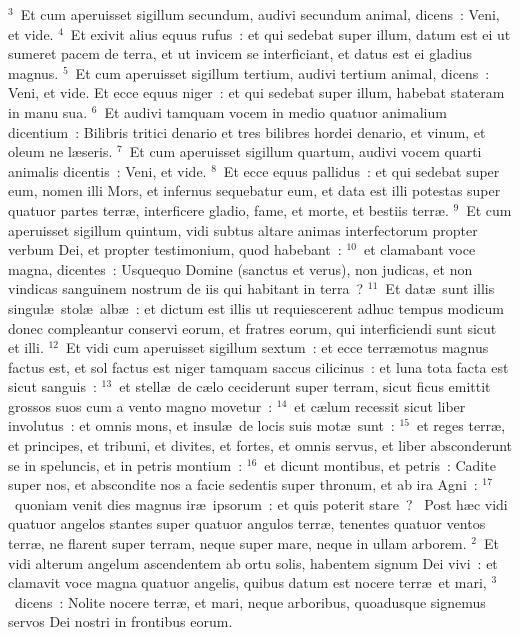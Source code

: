 ${}^{3}$~Et cum aperuisset sigillum secundum, audivi secundum animal, dicens~: Veni, et vide.
${}^{4}$~Et exivit alius equus rufus~: et qui sedebat super illum, datum est ei ut sumeret pacem de terra, et ut invicem se interficiant, et datus est ei gladius magnus.
${}^{5}$~Et cum aperuisset sigillum tertium, audivi tertium animal, dicens~: Veni, et vide. Et ecce equus niger~: et qui sedebat super illum, habebat stateram in manu sua.
${}^{6}$~Et audivi tamquam vocem in medio quatuor animalium dicentium~: Bilibris tritici denario et tres bilibres hordei denario, et vinum, et oleum ne l\ae seris.
${}^{7}$~Et cum aperuisset sigillum quartum, audivi vocem quarti animalis dicentis~: Veni, et vide.
${}^{8}$~Et ecce equus pallidus~: et qui sedebat super eum, nomen illi Mors, et infernus sequebatur eum, et data est illi potestas super quatuor partes terr\ae , interficere gladio, fame, et morte, et bestiis terr\ae .
${}^{9}$~Et cum aperuisset sigillum quintum, vidi subtus altare animas interfectorum propter verbum Dei, et propter testimonium, quod habebant~:
${}^{10}$~et clamabant voce magna, dicentes~: Usquequo Domine (sanctus et verus), non judicas, et non vindicas sanguinem nostrum de iis qui habitant in terra~?
${}^{11}$~Et dat\ae\ sunt illis singul\ae\ stol\ae\ alb\ae~: et dictum est illis ut requiescerent adhuc tempus modicum donec compleantur conservi eorum, et fratres eorum, qui interficiendi sunt sicut et illi.
${}^{12}$~Et vidi cum aperuisset sigillum sextum~: et ecce terr\ae motus magnus factus est, et sol factus est niger tamquam saccus cilicinus~: et luna tota facta est sicut sanguis~:
${}^{13}$~et stell\ae\ de c\ae lo ceciderunt super terram, sicut ficus emittit grossos suos cum a vento magno movetur~:
${}^{14}$~et c\ae lum recessit sicut liber involutus~: et omnis mons, et insul\ae\ de locis suis mot\ae\ sunt~:
${}^{15}$~et reges terr\ae , et principes, et tribuni, et divites, et fortes, et omnis servus, et liber absconderunt se in speluncis, et in petris montium~:
${}^{16}$~et dicunt montibus, et petris~: Cadite super nos, et abscondite nos a facie sedentis super thronum, et ab ira Agni~:
${}^{17}$~quoniam venit dies magnus ir\ae\ ipsorum~: et quis poterit stare~?
~Post h\ae c vidi quatuor angelos stantes super quatuor angulos terr\ae , tenentes quatuor ventos terr\ae , ne flarent super terram, neque super mare, neque in ullam arborem.
${}^{2}$~Et vidi alterum angelum ascendentem ab ortu solis, habentem signum Dei vivi~: et clamavit voce magna quatuor angelis, quibus datum est nocere terr\ae\ et mari,
${}^{3}$~dicens~: Nolite nocere terr\ae , et mari, neque arboribus, quoadusque signemus servos Dei nostri in frontibus eorum.


